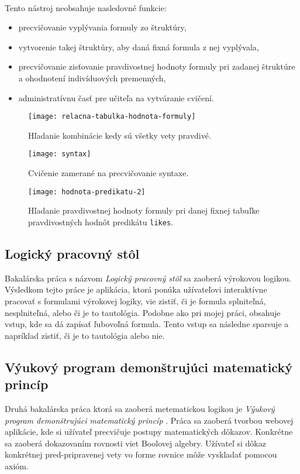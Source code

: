 \paragraph{}
Tento nástroj neobsahuje nasledovné funkcie:
\begin{itemize}
	\item precvičovanie vyplývania formuly zo štruktúry,
	\item vytvorenie takej štruktúry, aby daná fixná formula z nej vyplývala,
	\item precvičovanie zisťovanie pravdivostnej hodnoty formuly pri zadanej štruktúre a ohodnotení indivíduových premenných,
	\item administratívnu časť pre učiteľa na vytváranie cvičení.
\end{itemize}

\begin{figure}[h]
	\centering
	\texttt{[image: relacna-tabulka-hodnota-formuly]}
	\caption{Hľadanie kombinácie kedy sú všetky vety pravdivé.}
	\label{fig:fixne-formuly}
\end{figure}

\begin{figure}[h]
	\centering
	\texttt{[image: syntax]}
	\caption{Cvičenie zamerané na precvičovanie syntaxe.}
	\label{fig:syntax}
\end{figure}

\begin{figure}[h]
	\centering
	\texttt{[image: hodnota-predikatu-2]}
	\caption{Hľadanie pravdivostnej hodnoty formuly pri danej fixnej tabuľke pravdivostných hodnôt predikátu \texttt{likes}.}
	\label{fig:hodnota-predikatu-2}
\end{figure}




\subsection{Logický pracovný stôl}
Bakalárska práca s názvom \emph{Logický pracovný stôl} \cite{lps} sa zaoberá výrokovou logikou. Výsledkom tejto práce je aplikácia, ktorá ponúka užívateľovi interaktívne pracovať s formulami výrokovej logiky, vie zistiť, či je formula splniteľná, nesplniteľná, alebo či je to tautológia. Podobne ako pri mojej práci, obsahuje vstup, kde sa dá zapísať ľubovoľná formula. Tento vstup sa následne sparsuje a napríklad zistiť, či je to tautológia alebo nie.

\subsection{Výukový program demonštrujúci matematický princíp}
Druhá bakalárska práca ktorá sa zaoberá metematickou logikou je \emph{Výukový program demonštrujúci matematický princíp} \cite{vpdmp}. Práca sa zaoberá tvorbou webovej aplikácie, kde si užívateľ precvičuje postupy matematických dôkazov. Konkrétne sa zaoberá dokazovaním rovnosti viet Boolovej algebry. Užívateľ si dôkaz konkrétnej pred-pripravenej vety vo forme rovnice môže vyskladať pomocou axióm. 
